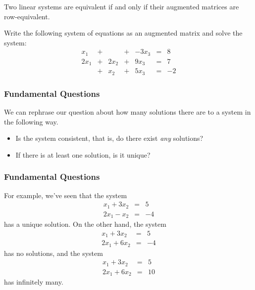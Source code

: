   \begin{frame}[fragile]\frametitle{}
Two linear systems are equivalent if and only if their augmented matrices
are row-equivalent.



 Write the following system of equations as an augmented matrix and solve the system:
 \[
\begin{array}{rcrcrcr}
  x_1  & + &       & + & -3 x_3 & =  & 8 \\
  2x_1 & + & 2 x_2 & + & 9 x_3  & =  & 7 \\
       & + &  x_2  & + & 5 x_3  & =  & -2 
\end{array}
\]

\end{frame}


  \begin{frame}[fragile]\frametitle{Fundamental Questions}

We can rephrase our question about how many solutions there are to a system in the following way.


\begin{itemize}
 \item Is the system consistent, that is, do there exist {\em any} solutions?
 \item If there is at least one solution, is it unique?
\end{itemize}

\end{frame}

  \begin{frame}[fragile]\frametitle{Fundamental Questions}

For example, we've seen that the system 
\begin{eqnarray*}
 x_1 + 3 x_2 &=&5\\
 2x_1 -x_2 &=& -4
\end{eqnarray*}
has a unique solution. 
On the other hand, the system 
\begin{eqnarray*}
 x_1 + 3 x_2 &=&5\\
 2x_1 +6 x_2 &=& -4
\end{eqnarray*}
has no solutions,
 and the system
\begin{eqnarray*}
 x_1 + 3 x_2 &=&5\\
 2x_1 +6 x_2 &=& 10
\end{eqnarray*}
has infinitely many.

\end{frame}

